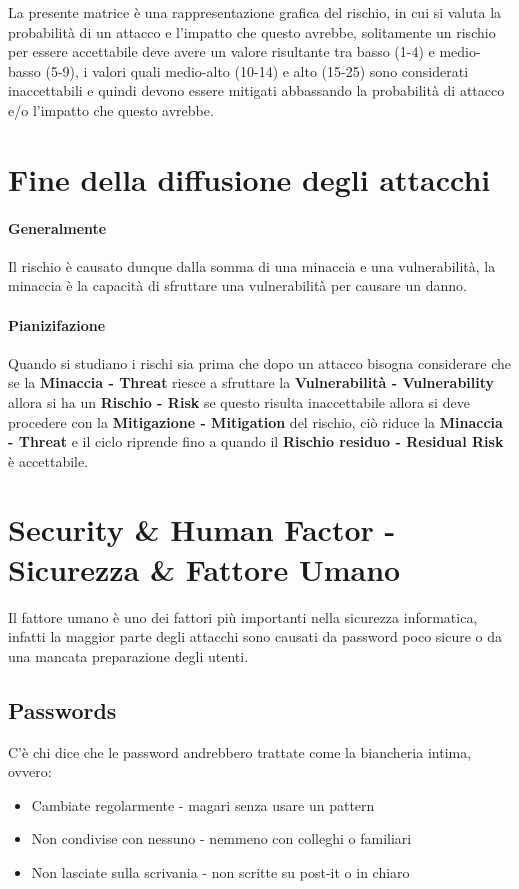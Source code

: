             La presente matrice è una rappresentazione grafica del rischio, in cui si valuta la probabilità di un attacco e l'impatto che questo avrebbe, solitamente un rischio per essere accettabile deve avere un valore risultante tra basso (1-4) e medio-basso (5-9), i valori quali medio-alto (10-14) e alto (15-25) sono considerati inaccettabili e quindi devono essere mitigati abbassando la probabilità di attacco e/o l'impatto che questo avrebbe.

\section{Fine della diffusione degli attacchi}
    \paragraph{Generalmente} Il rischio è causato dunque dalla somma di una minaccia e una vulnerabilità, la minaccia è la capacità di sfruttare una vulnerabilità per causare un danno. 
    \paragraph{Pianizifazione} Quando si studiano i rischi sia prima che dopo un attacco bisogna considerare che se la \textbf{Minaccia - Threat} riesce a sfruttare la \textbf{Vulnerabilità - Vulnerability} allora si ha un \textbf{Rischio - Risk} se questo risulta inaccettabile allora si deve procedere con la \textbf{Mitigazione - Mitigation} del rischio, ciò riduce la \textbf{Minaccia - Threat} e il ciclo riprende fino a quando il \textbf{Rischio residuo - Residual Risk} è accettabile.

\section{Security \& Human Factor - Sicurezza \& Fattore Umano}
    Il fattore umano è uno dei fattori più importanti nella sicurezza informatica, infatti la maggior parte degli attacchi sono causati da password poco sicure o da una mancata preparazione degli utenti.
    \subsection{Passwords}
        C'è chi dice che le password andrebbero trattate come la biancheria intima, ovvero:
        \begin{itemize}
            \item Cambiate regolarmente - magari senza usare un pattern
            \item Non condivise con nessuno - nemmeno con colleghi o familiari
            \item Non lasciate sulla scrivania - non scritte su post-it o in chiaro
        \end{itemize}
